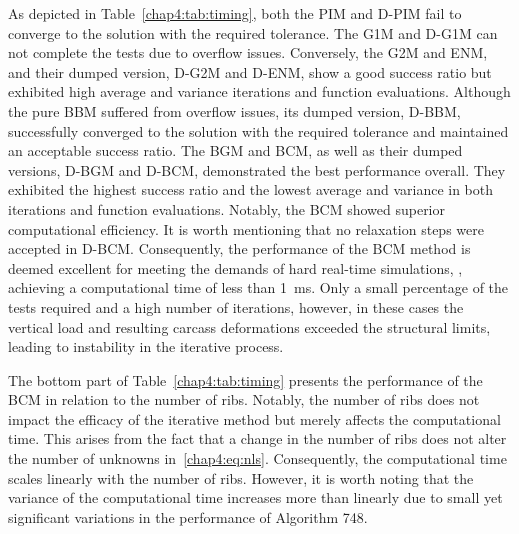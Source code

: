 As depicted in Table~\ref{chap4:tab:timing}, both the PIM and D-PIM fail to converge to the solution with the required tolerance. The G1M and D-G1M can not complete the tests due to overflow issues. Conversely, the G2M and ENM, and their dumped version, D-G2M and D-ENM, show a good success ratio but exhibited high average and variance iterations and function evaluations. Although the pure BBM suffered from overflow issues, its dumped version, D-BBM, successfully converged to the solution with the required tolerance and maintained an acceptable success ratio. The BGM and BCM, as well as their dumped versions, D-BGM and D-BCM, demonstrated the best performance overall. They exhibited the highest success ratio and the lowest average and variance in both iterations and function evaluations. Notably, the BCM showed superior computational efficiency. It is worth mentioning that no relaxation steps were accepted in D-BCM. Consequently, the performance of the BCM method is deemed excellent for meeting the demands of hard real-time simulations, \ie{}, achieving a computational time of less than \SI{1}{\milli\second}. Only a small percentage of the tests required and a high number of iterations, however, in these cases the vertical load and resulting carcass deformations exceeded the structural limits, leading to instability in the iterative process.

The bottom part of Table~\ref{chap4:tab:timing} presents the performance of the BCM in relation to the number of ribs. Notably, the number of ribs does not impact the efficacy of the iterative method but merely affects the computational time. This arises from the fact that a change in the number of ribs does not alter the number of unknowns in~\eqref{chap4:eq:nls}.  Consequently, the computational time scales linearly with the number of ribs. However, it is worth noting that the variance of the computational time increases more than linearly due to small yet significant variations in the performance of Algorithm 748.

